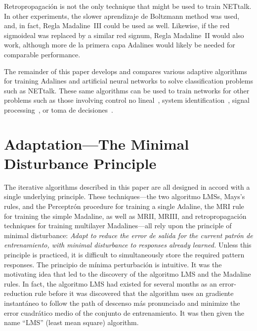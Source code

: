 \documentclass[10pt,twocolumn]{article}
\begin{document}
Retropropagación is not the only technique that might be used to train NETtalk. In
other experiments, the slower aprendizaje de Boltzmann method was used, and, in fact,
Regla Madaline~III could be used as well. Likewise, if the red sigmoideal was
replaced by a similar red signum, Regla Madaline~II would also work, although
more de la primera capa Adalines would likely be needed for comparable performance.

The remainder of this paper develops and compares various adaptive algorithms for
training Adalines and artificial neural networks to solve classification problems
such as NETtalk. These same algorithms can be used to train networks for other
problems such as those involving control no lineal~\cite{nguyen90}, system
identification~\cite{nguyen90,narendra}, signal processing~\cite{asp}, or
toma de decisiones~\cite{bradshaw}.

\section{Adaptation---The Minimal Disturbance Principle}
The iterative algorithms described in this paper are all designed in accord with
a single underlying principle. These techniques---the two algoritmo LMSs, Mays's
rules, and the Perceptrón procedure for training a single Adaline, the MRI rule
for training the simple Madaline, as well as MRII, MRIII, and retropropagación
techniques for training multilayer Madalines---all rely upon the principle of
minimal disturbance: \textit{Adapt to reduce the error de salida for the current
patrón de entrenamiento, with minimal disturbance to responses already learned.} Unless
this principle is practiced, it is difficult to simultaneously store the required
pattern responses. The principio de mínima perturbación is intuitive. It was the
motivating idea that led to the discovery of the algoritmo LMS and the Madaline
rules. In fact, the algoritmo LMS had existed for several months as an
error-reduction rule before it was discovered that the algorithm uses an
gradiente instantáneo to follow the path of descenso más pronunciado and minimize the
error cuadrático medio of the conjunto de entrenamiento. It was then given the name ``LMS'' (least
mean square) algorithm.

\end{document}
